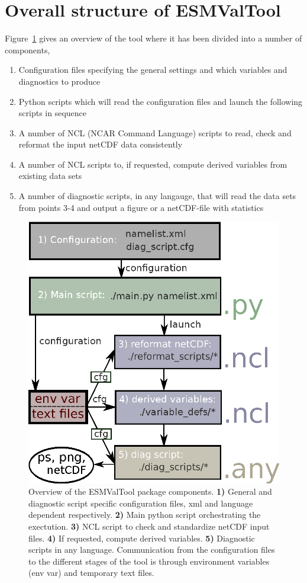 \documentclass[12pt]{article}
\begin{document}
\section{Overall structure of ESMValTool}\label{section:overall_structure}
Figure~\ref{fig:overview1} gives an overview of the tool where it has
been divided into a number of components, 
\begin{enumerate}
\item Configuration files specifying the general settings and which 
variables and diagnostics to produce
\item Python scripts which will read the configuration files and
launch the following scripts in sequence
\item A number of NCL (NCAR Command Language) scripts to read, check
and reformat the input netCDF data consistently
\item A number of NCL scripts to, if requested, compute derived
variables from existing data sets
\item A number of diagnostic scripts, in any langauge, that will read the
data sets from points 3-4 and output a figure or a netCDF-file with
statistics
\end{enumerate}
%
%
\begin{figure}
\begin{center}
\includegraphics{figures/overview1}
\caption{Overview of the ESMValTool package components. \textbf{1)}
General and diagnostic script specific configuration files, xml and
language dependent respectively. \textbf{2)} Main python script
orchestrating the exectution. \textbf{3)} NCL script to check and
standardize netCDF input files. \textbf{4)} If requested, compute
derived variables. \textbf{5)} Diagnostic scripts in any language.
Communication from the configuration files to the different stages of
the tool is through environment variables (env var) and temporary text
files.}\label{fig:overview1}
\end{center}
\end{figure}
\end{document}
